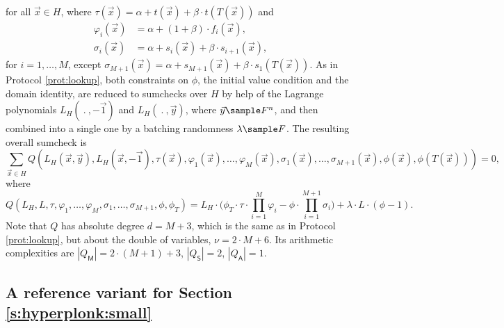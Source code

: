 \documentclass[11pt]{article}
\theoremstyle{definition}
\theoremstyle{definition}
\begin{document}
for all $\vec x \in H$, where $\tau(\vec x) = \alpha + t(\vec x) + \beta\cdot t(T( \vec x))$ and
\begin{align*}
\varphi_{i} (\vec x) &=\alpha +  (1+\beta)\cdot f_i(\vec x),
\\
\sigma_{i}(\vec x) &= \alpha + s_i(\vec x) + \beta\cdot s_{i+1}(\vec x), 
\end{align*}
 for $i=1,\ldots, M$, except $\sigma_{M+1}(\vec x) =  \alpha + s_{M+1}(\vec x) + \beta\cdot s_1(T( \vec x))$.
As in Protocol \ref{prot:lookup}, both constraints on $\phi$, the initial value condition and the domain identity, are reduced to sumchecks over $H$ by help of the Lagrange polynomials $L_H(\:.\:, -\vec 1)$ and $L_H(\:.\:, \vec y)$, where $\vec y\sample F^n$, and then combined into a single one by a batching randomness $\lambda\sample F$.
The resulting overall sumcheck is
\[
\sum_{\vec x\in H} Q(L_H(\vec x, \vec y), L_H(\vec x, -\vec 1),  \tau(\vec x), \varphi_{1}(\vec x),\ldots, \varphi_{M}(\vec x), \sigma_{1}(\vec x),\ldots, \sigma_{M+1}(\vec x),  \phi(\vec x), \phi(T(\vec x))) = 0,
\]
where
\begin{equation}
\label{e:lookup:hyperplonk:Q}
Q(L_H, L,   \tau, \varphi_1,\ldots, \varphi_M, \sigma_1,\ldots, \sigma_{M+1}, \phi, \phi_T) 
= L_H \cdot \Big(\phi_T \cdot \tau \cdot\prod_{i=1}^M \varphi_i
- \phi \cdot \prod_{i=1}^{M+1} \sigma_i \Big)
+ \lambda\cdot L \cdot (\phi - 1). 
\end{equation}
Note that $Q$ has  absolute degree $d = M+3$, which is the same as in Protocol \ref{prot:lookup}, but  about the double of variables, $\nu= 2\cdot M+ 6$.
Its arithmetic complexities are $|Q_\mathsf M|= 2\cdot(M+1) + 3$, $|Q_\mathsf S|= 2$, $|Q_\mathsf A|= 1$. 


\subsection{A reference variant for Section \ref{s:hyperplonk:small}}
\label{s:hyperplonk:large}
\end{document}
